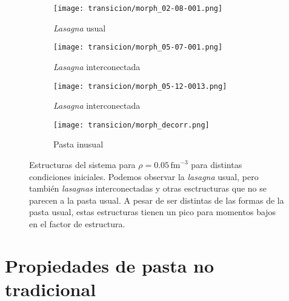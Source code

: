 \begin{figure*}[floatfix]%
  \centering
  \begin{subfigure}[h!]{0.3\columnwidth}
    \texttt{[image: transicion/morph\_02-08-001.png]}
    \caption{\emph{Lasagna} usual}
  \end{subfigure}
  \begin{subfigure}[h!]{0.3\columnwidth}
    \texttt{[image: transicion/morph\_05-07-001.png]}
    \caption{\emph{Lasagna} interconectada}
  \end{subfigure}
  \begin{subfigure}[h!]{0.3\columnwidth}
    \texttt{[image: transicion/morph\_05-12-0013.png]}
    \caption{\emph{Lasagna} interconectada}
  \end{subfigure}
  \begin{subfigure}[h!]{0.3\columnwidth}
    \texttt{[image: transicion/morph\_decorr.png]}
    \caption{Pasta inusual}
  \end{subfigure}
  \caption{Estructuras del sistema para $\rho=0.05\,\text{fm}^{-3}$ para distintas condiciones iniciales.
    Podemos observar la \emph{lasagna} usual, pero también \emph{lasagnas} interconectadas y otras esctructuras que no se parecen a la pasta usual.
    A pesar de ser distintas de las formas de la pasta usual, estas estructuras tienen un pico para momentos bajos en el factor de estructura.}
  \label{fig:cool_morph}
\end{figure*}

\section{Propiedades de pasta no tradicional}
\label{unusual_pasta}

